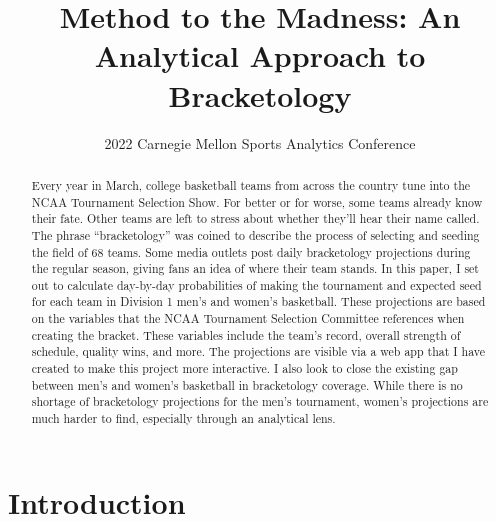 \documentclass{article}
\title{Method to the Madness: An Analytical Approach to Bracketology}
\author{2022 Carnegie Mellon Sports Analytics Conference}
\begin{document}
\maketitle

\begin{abstract}

Every year in March, college basketball teams from across the country tune into the NCAA Tournament Selection Show. For better or for worse, some teams already know their fate. Other teams are left to stress about whether they’ll hear their name called. The phrase “bracketology” was coined to describe the process of selecting and seeding the field of 68 teams. Some media outlets post daily bracketology projections during the regular season, giving fans an idea of where their team stands. In this paper, I set out to calculate day-by-day probabilities of making the tournament and expected seed for each team in Division 1 men’s and women’s basketball. These projections are based on the variables that the NCAA Tournament Selection Committee references when creating the bracket. These variables include the team’s record, overall strength of schedule, quality wins, and more. The projections are visible via a web app that I have created to make this project more interactive. I also look to close the existing gap between men’s and women’s basketball in bracketology coverage. While there is no shortage of bracketology projections for the men’s tournament, women’s projections are much harder to find, especially through an analytical lens.

\end{abstract}

\section{Introduction}
\end{document}
